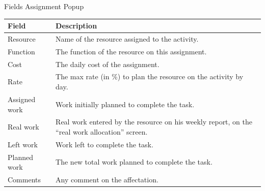 \documentclass[letterpaper,10pt,english]{sphinxmanual}
\begin{document}
\begin{threeparttable}
\capstart\caption{Fields Assignment Popup}
\label{PlanningElements:id2}
\begin{tabulary}{\linewidth}{|l|l|}
\hline
\textsf{\relax 
Field
} & \textsf{\relax 
Description
}\\
\hline
Resource
 & 
Name of the resource assigned to the activity.
\\
\hline
Function
 & 
The function of the resource on this assignment.
\\
\hline
Cost
 & 
The daily cost of the assignment.
\\
\hline
Rate
 & 
The max rate (in \%) to plan the resource on the activity by day.
\\
\hline
Assigned work
 & 
Work initially planned to complete the task.
\\
\hline
Real work
 & 
Real work entered by the resource on his weekly report, on the “real work allocation” screen.
\\
\hline
Left work
 & 
Work left to complete the task.
\\
\hline
Planned work
 & 
The new total work planned to complete the task.
\\
\hline
Comments
 & 
Any comment on the affectation.
\\
\hline\end{tabulary}

\end{threeparttable}
\end{document}
